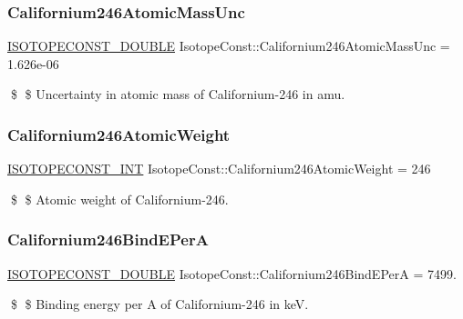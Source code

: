 \subsubsection{\texorpdfstring{Californium246\+Atomic\+Mass\+Unc}{Californium246AtomicMassUnc}}
{\footnotesize\ttfamily \mbox{\hyperlink{group___isotope_const-_macros_ga8f45a7272ce02c0b4c65c44636ed719a}{I\+S\+O\+T\+O\+P\+E\+C\+O\+N\+S\+T\+\_\+\+D\+O\+U\+B\+LE}} Isotope\+Const\+::\+Californium246\+Atomic\+Mass\+Unc = 1.\+626e-\/06}

\$ \$ Uncertainty in atomic mass of Californium-\/246 in amu. \mbox{\label{group___isotope_const-_californium-_cf246_gaf2091cb5d1269eff67b3a907dac8f4f2}} 
\subsubsection{\texorpdfstring{Californium246\+Atomic\+Weight}{Californium246AtomicWeight}}
{\footnotesize\ttfamily \mbox{\hyperlink{group___isotope_const-_macros_ga5f18360b3e99483a35c32d789e62621c}{I\+S\+O\+T\+O\+P\+E\+C\+O\+N\+S\+T\+\_\+\+I\+NT}} Isotope\+Const\+::\+Californium246\+Atomic\+Weight = 246}

\$ \$ Atomic weight of Californium-\/246. \mbox{\label{group___isotope_const-_californium-_cf246_ga8406709329ca1bda093995401233c6fd}} 
\subsubsection{\texorpdfstring{Californium246\+Bind\+E\+PerA}{Californium246BindEPerA}}
{\footnotesize\ttfamily \mbox{\hyperlink{group___isotope_const-_macros_ga8f45a7272ce02c0b4c65c44636ed719a}{I\+S\+O\+T\+O\+P\+E\+C\+O\+N\+S\+T\+\_\+\+D\+O\+U\+B\+LE}} Isotope\+Const\+::\+Californium246\+Bind\+E\+PerA = 7499.}

\$ \$ Binding energy per A of Californium-\/246 in keV. \mbox{\label{group___isotope_const-_californium-_cf246_ga8a58a10afe6573871bae12b4d538a170}} 
